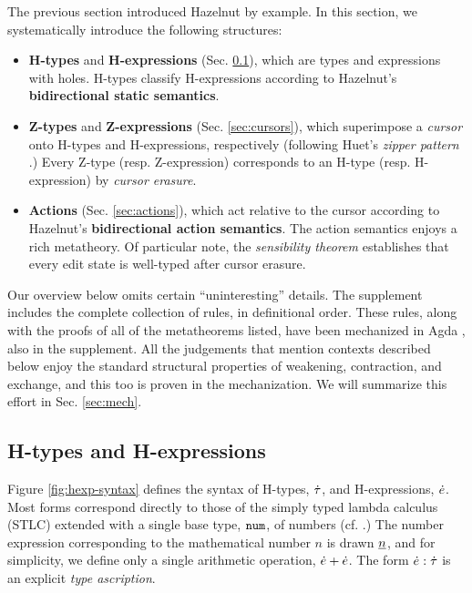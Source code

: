 
The previous section introduced Hazelnut by example. In this section, we
systematically introduce the following structures:
\begin{itemize}[itemsep=0px,partopsep=2px,topsep=2px]
\item \textbf{H-types} and \textbf{H-expressions} (Sec. \ref{sec:holes}),
  which are types and expressions with {holes}. H-types classify
  H-expressions according to Hazelnut's \textbf{bidirectional static
    semantics}.

\item \textbf{Z-types} and \textbf{Z-expressions} (Sec. \ref{sec:cursors}),
  which superimpose\- a \emph{cursor} onto H-types and H-expressions,
  respectively (following Huet's \emph{zipper pattern}
  \cite{JFP::Huet1997}.) Every Z-type (resp. Z-expression) corresponds to
  an H-type (resp. H-expression) by \emph{cursor erasure}.

\item \textbf{Actions} (Sec. \ref{sec:actions}), which act relative to the
  cursor according to Hazelnut's \textbf{bidirectional action
    semantics}. The action semantics enjoys a rich metatheory. Of
  particular note, the \emph{sensibility theorem} establishes that every
  edit state is well-typed after cursor erasure.
\end{itemize}

Our overview below omits certain ``uninteresting'' details. The supplement
includes the complete collection of rules, in definitional order. These
rules, along with the proofs of all of the metatheorems listed, have been
mechanized in Agda \cite{norell:thesis}, also in the supplement. All the
judgements that mention contexts described below enjoy the standard
structural properties of weakening, contraction, and exchange, and this too
is proven in the mechanization. We will summarize this effort in
Sec. \ref{sec:mech}.

\subsection{H-types and H-expressions}\label{sec:holes}
Figure \ref{fig:hexp-syntax} defines the syntax of H-types, $\dot{\tau}$, and
H-expressions, $\dot{e}$. Most forms correspond directly to those of the
simply typed lambda calculus (STLC) extended with a single base type,
$\texttt{num}$, of numbers (cf. \cite{pfpl}.) The number expression corresponding
to the mathematical number $n$ is drawn $\underline{n}$, and for simplicity, we
define only a single arithmetic operation, $\dot{e} + \dot{e}$. The form
$\dot{e} : \dot{\tau}$ is an explicit \emph{type ascription}.

